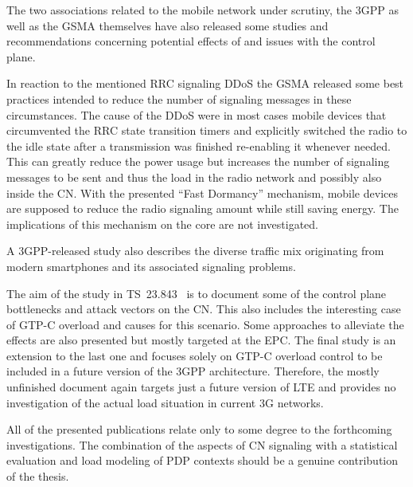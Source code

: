 The two associations related to the mobile network under scrutiny, the \gls{3GPP} as well as the \gls{GSMA} themselves have also released some studies and recommendations concerning potential effects of and issues with the control plane. 

In reaction to the mentioned \gls{RRC} signaling \gls{DDoS} the \gls{GSMA} released some best practices \cite{gsma2011fdbestpract} intended to reduce the number of signaling messages in these circumstances. The cause of the \gls{DDoS} were in most cases mobile devices that circumvented the \gls{RRC} state transition timers and explicitly switched the radio to the idle state after a transmission was finished re-enabling it whenever needed. This can greatly reduce the power usage but increases the number of signaling messages to be sent and thus the load in the radio network and possibly also inside the \gls{CN}. With the presented ``Fast Dormancy'' mechanism, mobile devices are supposed to reduce the radio signaling amount while still saving energy. The implications of this mechanism on the core are not investigated.

A \gls{3GPP}-released study \cite{3gpp.22.801} also describes the diverse traffic mix originating from modern smartphones and its associated signaling problems.

The aim of the study in \gls{TS}~23.843~\cite{3gpp.23.843} is to document some of the control plane bottlenecks and attack vectors on the \gls{CN}. This also includes the interesting case of \gls{GTP-C} overload and causes for this scenario. Some approaches to alleviate the effects are also presented but mostly targeted at the \gls{EPC}. The final study is an extension to the last one \cite{3gpp.29.807} and focuses solely on \gls{GTP-C} overload control to be included in a future version of the \gls{3GPP} architecture. Therefore, the mostly unfinished document again targets just a future version of \gls{LTE} and provides no investigation of the actual load situation in current \gls{3G} networks.

All of the presented publications relate only to some degree to the forthcoming investigations. The combination of the aspects of \gls{CN} signaling with a statistical evaluation and load modeling of \gls{PDP} contexts should be a genuine contribution of the thesis.



